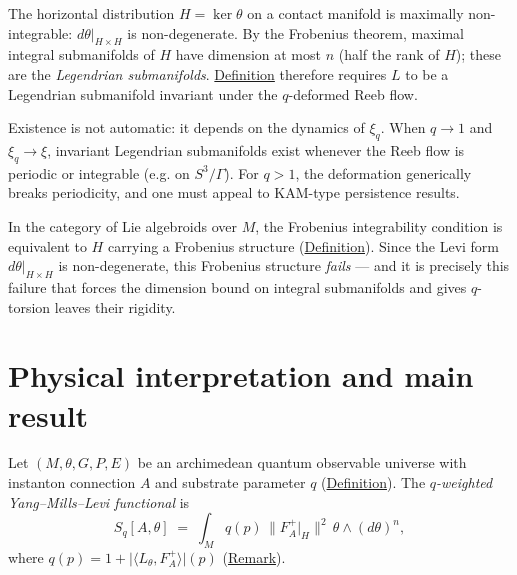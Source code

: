 \begin{remark}
  \label{rem:q-torsion-existence}
The horizontal distribution $H = \ker\theta$ on a contact manifold is
maximally non-integrable: $d\theta|_{H \times H}$ is non-degenerate.
By the Frobenius theorem, maximal integral submanifolds of $H$ have
dimension at most $n$ (half the rank of $H$); these are the
\emph{Legendrian submanifolds}.  \hyperref[ex:q-torsion-leaf]{Definition}
therefore requires $L$ to be a Legendrian submanifold invariant under the
$q$-deformed Reeb flow.

Existence is not automatic: it depends on the dynamics of $\xi_q$.
When $q \to 1$ and $\xi_q \to \xi$, invariant Legendrian submanifolds
exist whenever the Reeb flow is periodic or integrable (e.g. on
$S^3/\Gamma$).  For $q > 1$, the deformation generically breaks
periodicity, and one must appeal to KAM-type persistence results.

In the category of Lie algebroids over $M$, the Frobenius integrability
condition is equivalent to $H$ carrying a Frobenius structure
(\hyperref[def:quantum-universe]{Definition}).  Since the Levi form
$d\theta|_{H \times H}$ is non-degenerate, this Frobenius structure
\emph{fails} --- and it is precisely this failure that forces the
dimension bound on integral submanifolds and gives $q$-torsion leaves
their rigidity.
\end{remark}

\section{Physical interpretation and main result}
\label{sec:physical-interpretation}

\begin{definition}
  \label{def:q-yang-mills-levi}
Let $(M, \theta, G, P, E)$ be an archimedean quantum observable universe
with instanton connection $A$ and substrate parameter $q$
(\hyperref[def:substrate-parameter]{Definition}).  The
\emph{$q$-weighted Yang--Mills--Levi functional} is
\[
S_q[A, \theta]
  \;=\; \int_M q(p)\,\lVert F_A^+|_H \rVert^2\,
        \theta \wedge (d\theta)^n,
\]
where $q(p) = 1 + \lvert\langle L_\theta, F_A^+\rangle\rvert(p)$
(\hyperref[rem:c-substrate-via-levi]{Remark}).
\end{definition}

